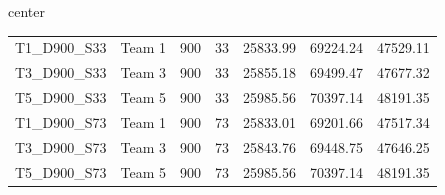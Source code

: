 {\begin{adjustbox}{center}
\begin{tabular}{llccrrr}
T1\_D900\_S33 & Team 1 & 900 & 33 & 25833.99 & 69224.24 & 47529.11 \\
T3\_D900\_S33 & Team 3 & 900 & 33 & 25855.18 & 69499.47 & 47677.32 \\
T5\_D900\_S33 & Team 5 & 900 & 33 & 25985.56 & 70397.14 & 48191.35 \\
			\midrule
T1\_D900\_S73 & Team 1 & 900 & 73 & 25833.01 & 69201.66 & 47517.34 \\
T3\_D900\_S73 & Team 3 & 900 & 73 & 25843.76 & 69448.75 & 47646.25 \\
T5\_D900\_S73 & Team 5 & 900 & 73 & 25985.56 & 70397.14 & 48191.35 \\
			\bottomrule
		\end{tabular}
	\end{adjustbox}
}

